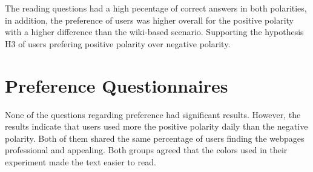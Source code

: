 The reading questions had a high pecentage of correct answers in both polarities, in addition, the
preference of users was higher overall for the positive polarity with a higher difference than the wiki-based scenario.
Supporting the hypothesis H3 of users prefering positive polarity over negative polarity.
\section{Preference Questionnaires}
None of the questions regarding preference had significant results. However, the results
indicate that users used more the positive polarity daily than the negative polarity. 
Both of them shared the same percentage of users finding the webpages professional and 
appealing. Both groups agreed that the colors used in their experiment made the text
easier to read. 


